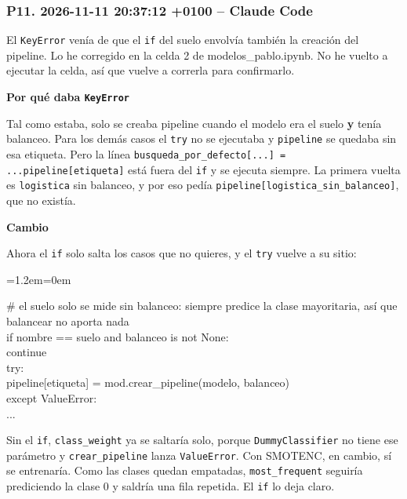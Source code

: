 \documentclass[11pt,a4paper]{article}
\newenvironment{codigo}
  {\par\smallskip\begin{list}{}{\leftmargin=1.2em\rightmargin=0em}\item\relax\ttfamily\scriptsize\raggedright}
  {\end{list}\smallskip}
\begin{document}
\subsubsection*{P11. 2026-11-11 20:37:12 +0100 -- Claude Code}
{\small
El \texttt{KeyError} venía de que el \texttt{if} del suelo envolvía también la creación del pipeline. Lo he corregido en la celda 2 de modelos\_\allowbreak{}pablo.ipynb. No he vuelto a ejecutar la celda, así que vuelve a correrla para confirmarlo.

\smallskip\noindent\textbf{Por qué daba \texttt{KeyError}}\par
Tal como estaba, solo se creaba pipeline cuando el modelo era el suelo \textbf{y} tenía balanceo. Para los demás casos el \texttt{try} no se ejecutaba y \texttt{pipeline} se quedaba sin esa etiqueta. Pero la línea \texttt{busqueda\_\allowbreak{}por\_\allowbreak{}defecto[...] = ...pipeline[etiqueta]} está fuera del \texttt{if} y se ejecuta siempre. La primera vuelta es \texttt{logistica} sin balanceo, y por eso pedía \texttt{pipeline[\textquotedbl{}logistica\_\allowbreak{}sin\_\allowbreak{}balanceo\textquotedbl{}]}, que no existía.

\smallskip\noindent\textbf{Cambio}\par
Ahora el \texttt{if} solo salta los casos que no quieres, y el \texttt{try} vuelve a su sitio:

\begin{codigo}
\# el suelo solo se mide sin balanceo: siempre predice la clase mayoritaria, así que balancear no aporta nada \\{}
if nombre == \textquotedbl{}suelo\textquotedbl{} and balanceo is not None: \\{}
\hspace*{2.08em}continue \\{}
try: \\{}
\hspace*{2.08em}pipeline[etiqueta] = mod.crear\_\allowbreak{}pipeline(modelo, balanceo) \\{}
except ValueError: \\{}
\hspace*{2.08em}...
\end{codigo}
Sin el \texttt{if}, \texttt{class\_\allowbreak{}weight} ya se saltaría solo, porque \texttt{DummyClassifier} no tiene ese parámetro y \texttt{crear\_\allowbreak{}pipeline} lanza \texttt{ValueError}. Con SMOTENC, en cambio, sí se entrenaría. Como las clases quedan empatadas, \texttt{most\_\allowbreak{}frequent} seguiría prediciendo la clase 0 y saldría una fila repetida. El \texttt{if} lo deja claro.

}
\end{document}
